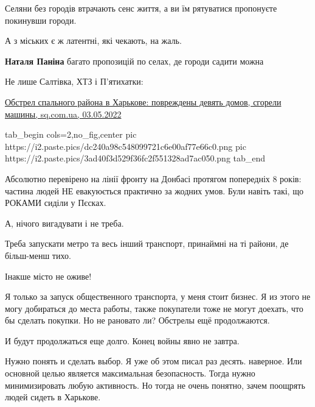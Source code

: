 \begin{itemize}
\begin{itemize}
\end{itemize} %


Селяни без городів втрачають сенс життя, а ви їм рятуватися пропонуєте покинувши городи.

А з міських є ж латентні, які чекають, на жаль.

\begin{itemize} %
\textbf{Наталя Паніна} багато пропозицій по селах, де городи садити можна
\end{itemize} %

Не лише Салтівка, ХТЗ і П'ятихатки:

\href{https://www.sq.com.ua/rus/novosti/03.05.2022/obstrel-spalnogo-raiona-v-xarkove-povrezdeny-devyat-domov-sgoreli-masiny}{%
Обстрел спального района в Харькове: повреждены девять домов, сгорели машины, sq.com.ua, 03.05.2022%
}


\ifcmt
  tab_begin cols=2,no_fig,center
     pic https://i2.paste.pics/dc240a98c548099721c6e00af77e66c0.png
     pic https://i2.paste.pics/3ad40f3d529f36fc2f551328ad7ac050.png
  tab_end
\fi


Абсолютно перевірено на лінії фронту на Донбасі протягом попередніх 8 років:
частина людей НЕ евакуюється практично за жодних умов. Були навіть такі, що
РОКАМИ сиділи у Пєсках.


А, нічого вигадувати і не треба.

Треба запускати метро та весь інший транспорт, принаймні на ті райони, де
більш-менш тихо.

Інакше місто не оживе!


Я только за запуск общественного транспорта, у меня стоит бизнес. Я из этого не
могу добираться до места работы, также покупатели тоже не могут доехать, что бы
сделать покупки. Но не рановато ли? Обстрелы ещё продолжаются.

\begin{itemize} %

И будут продолжаться еще долго. Конец войны явно не завтра.

Нужно понять и сделать выбор. Я уже об этом писал раз десять. наверное. Или
основной целью является максимальная безопасность. Тогда нужно минимизировать
любую активность. Но тогда не очень понятно, зачем поощрять людей сидеть в
Харькове.


\end{itemize}
\end{itemize}
